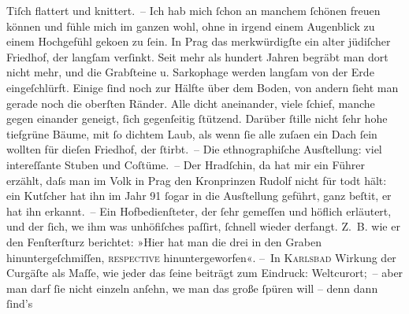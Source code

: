 \begin{ledgroupsized}[t]{13cm}
                    Tiſch flattert und knittert. – Ich hab mich ſchon an manchem ſchönen freuen
                    können und fühle mich im ganzen wohl, ohne in irgend einem Augenblick zu einem
                    Hochgefühl geko{\geminationm}en zu ſein. In Prag das merkwürdigſte ein alter jüdiſcher Friedhof, der langſam verſinkt. Seit mehr als
                    hundert Jahren begräbt man dort nicht mehr, und die Grabſteine u. Sarkophage
                    werden langſam von der Erde eingeſchlürft. Einige ſind noch zur Hälfte über dem
                    Boden, von andern ſieht man gerade noch die oberſten Ränder. Alle dicht
                    aneinander, viele ſchief, manche gegen einander geneigt, ſich gegenſeitig {\pb}ſtützend. Darüber ſtille nicht ſehr hohe
                    tiefgrüne Bäume, mit ſo dichtem Laub, als wenn ſie alle zuſa{\geminationm}en ein Dach ſein wollten für dieſen Friedhof, der ſtirbt. – Die ethnographiſche Ausſtellung: viel intereſſante
                    Stuben und Coſtüme. – Der Hradſchin, da
                    hat mir ein Führer erzählt, daſs man im Volk in Prag den Kronprinzen Rudolf
                    nicht für todt hält: ein Kutſcher hat ihn im Jahr 91{ }ſogar in die
                    Ausſtellung geführt, ganz beſti{\geminationm}t, er hat ihn
                    erkannt. – Ein Hofbedienſteter, der ſehr gemeſſen und höflich erläutert, und der
                    ſich, we{\geminationn} ihm was unhöfiſches paſſirt, ſchnell
                    wieder derfangt. Z. B. {\pb}wie er den Fenſterſturz
                    berichtet: »Hier hat man die drei in den Graben hinuntergeſchmiſſen, \textsc{reſpective} hinuntergeworfen«.\pend
           \pstart
           – In \textsc{Karlsbad} Wirkung der Curgäſte als Maſſe, wie jeder das ſeine beiträgt zum
                    Eindruck: Weltcurort; – aber man darf ſie nicht einzeln anſehn, we{\geminationn} man das große ſpüren will – denn dann ſind’s

\end{ledgroupsized}
